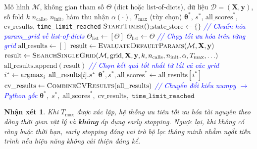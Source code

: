 \documentclass[12pt,a4paper]{article}
\newtheorem{remark}{Nhận xét}[section]
\newcommand{\argmax}{\operatornamewithlimits{argmax}}
\begin{document}
\begin{algorithm}[H]
\caption{Bayesian Optimization trong HAutoML --- hỗ trợ multi-grid (sử dụng \texttt{gp\_minimize})}
\label{alg:bayesian}
\scriptsize
\begin{algorithmic}[1]
\Require Mô hình $\mathcal{M}$, không gian tham số $\Theta$ (dict hoặc list-of-dicts), dữ liệu $\mathcal{D} = (\mathbf{X}, \mathbf{y})$, số fold $k$
\Require $n_{\text{calls}}$, $n_{\text{init}}$, hàm thu nhận $\alpha(\cdot)$, $T_{\max}$ (tùy chọn)
\Ensure $\boldsymbol{\theta}^*$, $s^*$, $\text{all\_scores}^*$, $\text{cv\_results}$, \texttt{time\_limit\_reached}
\State $\textsc{StartTimer}()$;\quad $\text{state\_store} \gets \{\}$
\Statex \textcolor{blue}{\textit{// Chuẩn hóa param\_grid về list-of-dicts}}
    \State $\Theta_{\text{list}} \gets [\Theta]$
\Else
    \State $\Theta_{\text{list}} \gets \Theta$
\EndIf
\Statex \textcolor{blue}{\textit{// Chạy tối ưu hóa trên từng grid}}
\State $\text{all\_results} \gets []$
        \State $\text{result} \gets \textsc{EvaluateDefaultParams}(\mathcal{M}, \mathbf{X}, \mathbf{y})$ 
    \Else
        \State $\text{result} \gets \textsc{SearchSingleGrid}(\mathcal{M}, \text{grid}, \mathbf{X}, \mathbf{y}, k, n_{\text{calls}}, n_{\text{init}}, \alpha, T_{\max}, \ldots)$
    \EndIf
    \State $\text{all\_results}.\text{append}(\text{result})$
\EndFor
\Statex \textcolor{blue}{\textit{// Chọn kết quả tốt nhất từ tất cả các grid}}
\State $i^* \gets \argmax_{i}\; \text{all\_results}[i].s^*$
\State $\boldsymbol{\theta}^*, s^*, \text{all\_scores}^* \gets \text{all\_results}[i^*]$
\State $\text{cv\_results} \gets \textsc{CombineCVResults}(\text{all\_results})$
\Statex \textcolor{blue}{\textit{// Chuyển đổi kiểu numpy $\rightarrow$ Python gốc}}
\State \Return $\boldsymbol{\theta}^*,\; s^*,\; \text{all\_scores}^*,\; \text{cv\_results},\; \texttt{time\_limit\_reached}$
\end{algorithmic}
\end{algorithm}

\begin{remark}
Khi $T_{\max}$ được xác lập, hệ thống ưu tiên tối ưu hóa tài nguyên theo dòng
thời gian vật lý và \textbf{không} áp dụng early stopping. Ngược lại, khi không
có ràng buộc thời hạn, early stopping đóng vai trò bộ lọc thông minh nhằm ngắt
tiến trình nếu hiệu năng không cải thiện đáng kể.
\end{remark}
\end{document}
